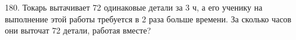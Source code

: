180. Токарь вытачивает 72 одинаковые детали за 3 ч, а его ученику на выполнение этой работы требуется в 2 раза больше времени. За сколько часов они выточат 72 детали, работая вместе?\\
